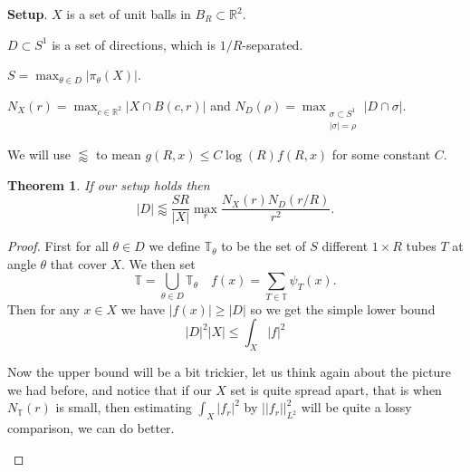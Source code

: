 \documentclass[12pt]{amsart}
\newtheorem{theorem}{Theorem}[section]
\newcommand{\RR}{\mathbb{R}}
\newcommand{\TT}{\mathbb{T}}
\begin{document}
\textbf{Setup}. 
$X$ is a set of unit balls in $B_R \subset \RR^2$. 

$D \subset S^1$ is a set of directions, which is $1/R$-separated.

$S = \max_{\theta \in D} |\pi_\theta (X)|$.

$N_X (r) = \max_{c \in \RR^2} |X \cap B(c,r)|$ and $N_D (\rho) = \max_{\substack{\sigma \subset S^1\\ |\sigma| = \rho}} |D \cap \sigma|$.

We will use $\lessapprox$ to mean $g(R,x) \leq C \log (R) f(R,x)$ for some constant $C$.
\begin{theorem}
    If our setup holds then \[
    |D| \lessapprox \frac{S R}{|X|} \max_{r} \frac{N_X (r) N_D (r/R)}{r^2}.
    \]
\end{theorem}
\begin{proof}
    First for all $\theta \in D$ we define $\TT_\theta$ to be the set of $S$ different $1 \times R$ tubes $T$ at angle $\theta$ that cover $X$.
    We then set
    \[
        \TT = \bigcup_{\theta \in D} \TT_\theta \quad f(x) = \sum_{T \in \TT}\psi_T (x).
    \]
    Then for any $x \in X$ we have $|f(x)| \geq |D|$ so we get the simple lower bound
    \[
        |D|^2 |X| \leq \int_{X} |f|^2
    \]

    
    Now the upper bound will be a bit trickier, let us think again about the picture we had before, and notice that if our $X$ set is quite spread apart, that is when $N_\TT (r)$ is small, then estimating $\int_{X} |f_r|^2$ by $||f_r||^2_{L^2}$ will be quite a lossy comparison, we can do better.
    \begin{center}
    
    \end{center}


\end{proof}
\end{document}
